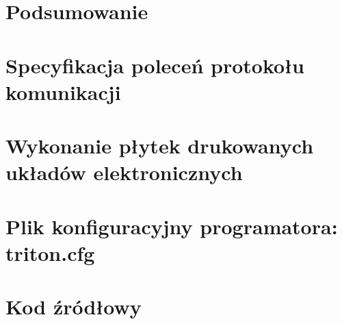 \documentclass[a4paper,12pt, oneside]{mwbk}
\begin{document}
\newpage
\chapter*{Podsumowanie}


\newpage 
\appendix
\chapter{Specyfikacja poleceń protokołu komunikacji}
\label{ch:bt-spec}

\chapter{Wykonanie płytek drukowanych układów elektronicznych}
\label{ch:boards-design}

\chapter{Plik konfiguracyjny programatora: triton.cfg}

\chapter*{Kod źródłowy}
%
\listoffigures
\listoftables

\newpage

{}


\newpage
\end{document}
